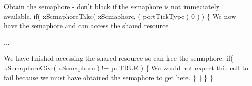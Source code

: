 \begin{DoxyPre}Obtain the semaphore - don't block if the semaphore is not
immediately available.
        if( xSemaphoreTake( xSemaphore, ( portTickType ) 0 ) )
        \{
We now have the semaphore and can access the shared resource.\end{DoxyPre}



\begin{DoxyPre}...\end{DoxyPre}



\begin{DoxyPre}We have finished accessing the shared resource so can free the
semaphore.
            if( xSemaphoreGive( xSemaphore ) != pdTRUE )
            \{
We would not expect this call to fail because we must have
obtained the semaphore to get here.
            \}
        \}
    \}
 \}
 \end{DoxyPre}
 